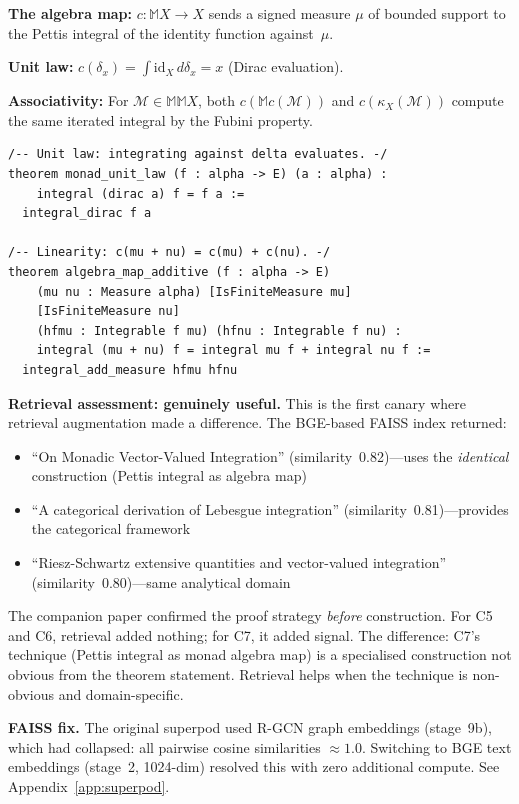 \documentclass[12pt,oneside]{book}
\theoremstyle{plain}
\theoremstyle{definition}
\theoremstyle{remark}
\begin{document}
\begin{proofbox}
\textbf{The algebra map:} $c : \mathbb{M}X \to X$ sends a signed
measure $\mu$ of bounded support to the Pettis integral of the
identity function against~$\mu$.

\textbf{Unit law:} $c(\delta_x) = \int \mathrm{id}_X \, d\delta_x
= x$ (Dirac evaluation).

\textbf{Associativity:} For $\mathcal{M} \in \mathbb{M}\mathbb{M}X$,
both $c(\mathbb{M}c(\mathcal{M}))$ and $c(\kappa_X(\mathcal{M}))$
compute the same iterated integral by the Fubini property.
\end{proofbox}

\begin{leanbox}
\begin{Verbatim}[fontsize=\small]
/-- Unit law: integrating against delta evaluates. -/
theorem monad_unit_law (f : alpha -> E) (a : alpha) :
    integral (dirac a) f = f a :=
  integral_dirac f a

/-- Linearity: c(mu + nu) = c(mu) + c(nu). -/
theorem algebra_map_additive (f : alpha -> E)
    (mu nu : Measure alpha) [IsFiniteMeasure mu]
    [IsFiniteMeasure nu]
    (hfmu : Integrable f mu) (hfnu : Integrable f nu) :
    integral (mu + nu) f = integral mu f + integral nu f :=
  integral_add_measure hfmu hfnu
\end{Verbatim}
\end{leanbox}

\begin{notebox}
\textbf{Retrieval assessment: genuinely useful.} This is the first
canary where retrieval augmentation made a difference. The BGE-based
FAISS index returned:

\begin{itemize}
\item ``On Monadic Vector-Valued Integration'' (similarity~0.82)---uses
  the \emph{identical} construction (Pettis integral as algebra map)
\item ``A categorical derivation of Lebesgue integration''
  (similarity~0.81)---provides the categorical framework
\item ``Riesz-Schwartz extensive quantities and vector-valued
  integration'' (similarity~0.80)---same analytical domain
\end{itemize}

The companion paper confirmed the proof strategy \emph{before}
construction. For C5 and C6, retrieval added nothing; for C7, it
added signal. The difference: C7's technique (Pettis integral as
monad algebra map) is a specialised construction not obvious from the
theorem statement. Retrieval helps when the technique is non-obvious
and domain-specific.

\medskip
\textbf{FAISS fix.} The original superpod used R-GCN graph embeddings
(stage~9b), which had collapsed: all pairwise cosine similarities
$\approx 1.0$. Switching to BGE text embeddings (stage~2, 1024-dim)
resolved this with zero additional compute. See Appendix~\ref{app:superpod}.
\end{notebox}
\end{document}

